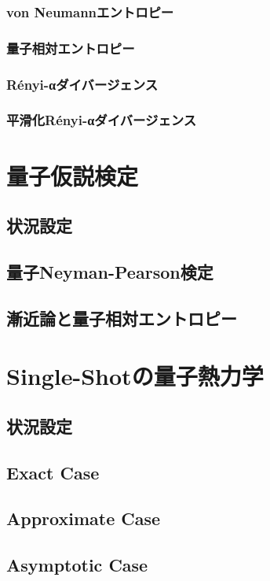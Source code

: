\documentclass[report]{jlreq}
\begin{document}
\subsection{von Neumannエントロピー}
\subsection{量子相対エントロピー}
\subsection{R\'{e}nyi-αダイバージェンス}
\subsection{平滑化R\'{e}nyi-αダイバージェンス}

\chapter{量子仮説検定}
\section{状況設定}
\section{量子Neyman-Pearson検定}
\section{漸近論と量子相対エントロピー}

\chapter{Single-Shotの量子熱力学}
\section{状況設定}
\section{Exact Case}
\section{Approximate Case}
\section{Asymptotic Case}
\end{document}
